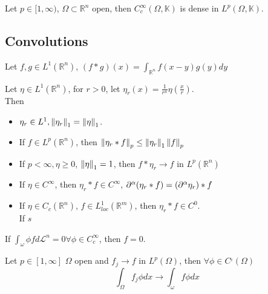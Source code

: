 \documentclass[../main.tex]{subfiles}
\begin{document}
\begin{thm}
	Let $p \in [ 1, \infty ) $, $\Omega \subset \mathbb{R}^n$ open, then $C^{ \infty }_c ( \Omega, \mathbb{K}) $ is dense in $L^{p}( \Omega, \mathbb{K}) $.\\
\end{thm}
\subsection{Convolutions}
Let $f,g \in L^{1}(  \mathbb{R}^{n}) $, $( f\ast g) ( x) = \int_{ \mathbb{R}^n }^{  } f( x-y) g( y) dy$ 
\begin{lemma}
Let $\eta\in L^{1}( \mathbb{R}^n) $, for $r>0$, let $\eta_r( x) = \frac{1}{r^{n}}\eta( \frac{x}{r}) $.\\
Then
\begin{itemize}
\item $\eta_r\in L^{1}, \left\lVert \eta_r\right\rVert_1 = \left\lVert \eta\right\rVert_1$.
\item If $f\in L^{p}( \mathbb{R}^n) $, then $ \left\lVert \eta_r \ast f\right\rVert_p \leq  \left\lVert \eta_r\right\rVert_{1} \left\lVert f\right\rVert_p$ 
\item If $p< \infty , \eta \geq 0$, $\left\lVert \eta\right\rVert_1 =1$, then $f\ast \eta_r \to f$ in $L^{p}(  \mathbb{R}^n) $ 
\item If $\eta \in C^{ \infty }$, then $\eta_r \ast f \in C^{ \infty }$, $\partial^{\alpha}( \eta_r \ast f) = ( \partial^{\alpha} \eta_r) \ast f$ 
\item If $\eta\in C_c( \mathbb{R}^n) $, $ f \in L^{1}_{loc} ( \mathbb{R}^m) $, then $\eta_r \ast f\in C^{0}$.\\
	If $s$ 
\end{itemize}
\end{lemma}
\begin{lemma}
If $ \int_\omega \phi f d \mathcal{L}^{n}=0 \forall \phi \in C^{ \infty }_c$, then $f=0$.
\end{lemma}
\begin{lemma}
Let $p \in [ 1, \infty ] $ $\Omega$ open and $f_j \to f$ in $L^{p}( \Omega) $, then $\forall \phi \in C^_c( \Omega) $
\[ 
\int_{ \Omega }^{  } f_j \phi dx \to \int_\omega f \phi dx
\]
\end{lemma}
\end{document}
